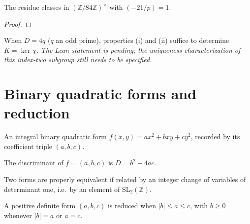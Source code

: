 \begin{theorem}[Exercise 1.15]
  \label{exr:s1_15}
  \leanok
  The residue classes in $(\mathbb Z/84\mathbb Z)^\times$ with $(-21/p)=1$.
\end{theorem}
\begin{proof}\end{proof}

\begin{theorem}[Exercise 1.16]
  \label{exr:s1_16}
  \notready
  When $D = 4q$ ($q$ an odd prime), properties (i) and (ii) suffice to determine
  $K = \ker\chi$. \emph{The Lean statement is pending; the uniqueness
  characterization of this index-two subgroup still needs to be specified.}
\end{theorem}

\section{Binary quadratic forms and reduction}

\begin{definition}
  \label{def:binary_qf}
  \leanok
  An integral binary quadratic form $f(x,y) = a x^2 + b x y + c y^2$, recorded by
  its coefficient triple $(a,b,c)$.
\end{definition}

\begin{definition}[Discriminant]
  \label{def:discriminant}
  \leanok
  The discriminant of $f = (a,b,c)$ is $D = b^2 - 4ac$.
\end{definition}

\begin{definition}
  \label{def:proper_equiv}
  \leanok
  Two forms are properly equivalent if related by an integer change of variables
  of determinant one, i.e.\ by an element of $\mathrm{SL}_2(\mathbb Z)$.
\end{definition}

\begin{definition}
  \label{def:reduced}
  \leanok
  A positive definite form $(a,b,c)$ is reduced when $|b| \le a \le c$, with
  $b \ge 0$ whenever $|b| = a$ or $a = c$.
\end{definition}

